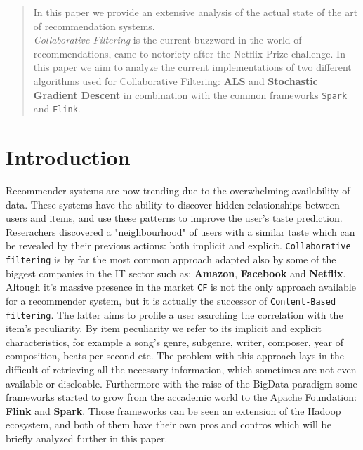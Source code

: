 \documentclass{sig-alternate-05-2015}
\begin{document}

\maketitle
\begin{abstract}

In this paper we provide an extensive analysis of the actual state of the
art of recommendation systems.\\
\textit{Collaborative Filtering} is the current buzzword in the
world of recommendations, came to notoriety after the Netflix Prize
challenge. In this paper we aim to analyze the current implementations
of two different algorithms used for Collaborative Filtering: \textbf{ALS} and \textbf{Stochastic
Gradient Descent} in combination with the common frameworks \texttt{Spark} and  \texttt{Flink}.
\end{abstract}





\section{Introduction}
Recommender systems are now trending due to the overwhelming availability
of data. These systems have the ability to discover hidden relationships between
users and items, and use these patterns to improve the user's taste prediction.
Reserachers discovered a "neighbourhood" of users with a similar taste
which can be revealed by their previous actions: both implicit and explicit.
\texttt{Collaborative filtering} is by far the most common approach adapted also by
some of the biggest companies in the IT sector such as: \textbf{Amazon}, \textbf{Facebook} and \textbf{Netflix}.
Altough it's massive presence in the market \texttt{CF} is not the only approach
available for a recommender system, but it is actually the successor of
\texttt{Content-Based filtering}. The latter aims to profile a user searching
the correlation with the item's peculiarity. By item peculiarity we refer to
its implicit and explicit characteristics, for example a song's genre,
subgenre, writer, composer, year of composition, beats per second etc.
The problem with this approach lays in the difficult of retrieving all the necessary
information, which sometimes are not even available or discloable.
Furthermore with the raise of the BigData paradigm some frameworks started to grow from
the accademic world to the Apache Foundation: \textbf{Flink} and \textbf{Spark}.
Those frameworks can be seen an extension of the Hadoop ecosystem, and both of them
have their own pros and contros which will be briefly analyzed further in this paper.
\end{document}

